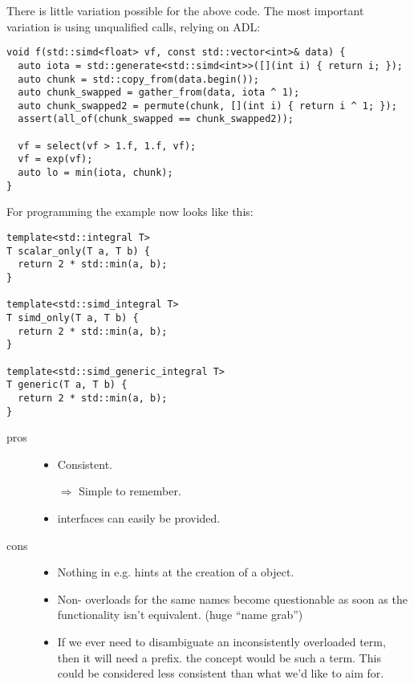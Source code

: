 There is little variation possible for the above code.
The most important variation is using unqualified calls, relying on ADL:
\medskip\begin{lstlisting}[style=Vc]
void f(std::simd<float> vf, const std::vector<int>& data) {
  auto iota = std::generate<std::simd<int>>([](int i) { return i; });
  auto chunk = std::copy_from(data.begin());
  auto chunk_swapped = gather_from(data, iota ^ 1);
  auto chunk_swapped2 = permute(chunk, [](int i) { return i ^ 1; });
  assert(all_of(chunk_swapped == chunk_swapped2));

  vf = select(vf > 1.f, 1.f, vf);
  vf = exp(vf);
  auto lo = min(iota, chunk);
}
\end{lstlisting}

For \simdgeneric programming the example now looks like this:
\medskip\begin{lstlisting}[style=Vc]
template<std::integral T>
T scalar_only(T a, T b) {
  return 2 * std::min(a, b);
}

template<std::simd_integral T>
T simd_only(T a, T b) {
  return 2 * std::min(a, b);
}

template<std::simd_generic_integral T>
T generic(T a, T b) {
  return 2 * std::min(a, b);
}
\end{lstlisting}

\begin{description}
  \item[pros]
    \begin{itemize}
      \item Consistent.
      \item[$\Rightarrow$] Simple to remember.
      \item \simdgeneric interfaces can easily be provided.
    \end{itemize}

  \item[cons]
    \begin{itemize}
      \item Nothing in e.g.  hints
        at the creation of a \simd object.
      \item Non- overloads for the same names become questionable
        as soon as the functionality isn't equivalent. (huge “name grab”)

      \item If we ever need to disambiguate an inconsistently overloaded term,
        then it will need a  prefix.
        \Eg the  concept would be such a term.
        This could be considered less consistent than what we'd like to aim
        for.
    \end{itemize}
\end{description}

